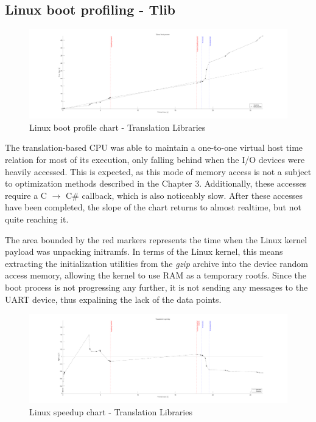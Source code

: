 \subsection*{Linux boot profiling - Tlib}
\begin{figure}[h]
	\centering
    \hspace*{-2cm}
	\includegraphics[width=1.2\textwidth]{figures/benchmarks/linux_boot/adnotated/TlibBoot.pdf}
	\caption{Linux boot profile chart - Translation Libraries}
\end{figure}

\noindent
The translation-based CPU was able to maintain a one-to-one virtual host time relation for most of
its execution, only falling behind when the I/O devices were heavily accessed. This is expected, as this mode of memory
access is not a subject to optimization methods described in the Chapter 3. Additionally, these accesses require a C
$\rightarrow$ C\# callback, which is also noticeably slow. After these accesses have been completed, the slope of the
chart returns to almost realtime, but not quite reaching it.

The area bounded by the red markers represents the time when the Linux kernel payload was unpacking initramfs. In terms
of the Linux kernel, this means extracting the initialization utilities from the \textit{gzip} archive into the
device random access memory, allowing the kernel to use RAM as a temporary rootfs. Since the boot process is not
progressing any further, it is not sending any messages to the UART device, thus expalining the lack of the data
points.

\begin{figure}[h]
	\centering
    \hspace*{-2cm}
	\includegraphics[width=1.2\textwidth]{figures/benchmarks/linux_boot/adnotated/TlibSpeedup.pdf}
	\caption{Linux speedup chart - Translation Libraries}
\end{figure}

